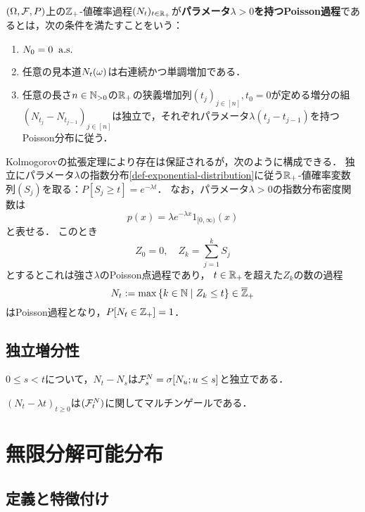 \documentclass[uplatex,dvipdfmx]{jsreport}
\begin{document}
\begin{definition}
    $(\Omega,\mathcal{F},P)$上の$\mathbb{Z}_+$-値確率過程$(N_t)_{t\in\mathbb{R}_+}$が\textbf{パラメータ$\lambda>0$を持つPoisson過程}であるとは，次の条件を満たすことをいう：
    \begin{enumerate}
        \item $N_0=0\;\;\mathrm{a.s.}$
        \item 任意の見本道$N_t(\omega)$は右連続かつ単調増加である．
        \item 任意の長さ$n\in\mathbb{N}_{>0}$の$\mathbb{R}_+$の狭義増加列$(t_j)_{j\in[n]},t_0=0$が定める増分の組$(N_{t_j}-N_{t_{j-1}})_{j\in[n]}$は独立で，それぞれパラメータ$\lambda(t_j-t_{j-1})$を持つPoisson分布に従う．
    \end{enumerate}
\end{definition}

\begin{discussion}[Poisson過程の構成]
    Kolmogorovの拡張定理により存在は保証されるが，次のように構成できる．
    独立にパラメータ$\lambda$の指数分布\ref{def-exponential-distribution}に従う$\mathbb{R}_+$-値確率変数列$(S_j)$を取る：$P[S_j\ge t]=e^{-\lambda t}$．
    なお，パラメータ$\lambda>0$の指数分布密度関数は
    \[p(x)=\lambda e^{-\lambda x}1_{[0,\infty)}(x)\]
    と表せる．
    このとき
    \[Z_0=0,\quad Z_k=\sum^k_{j=1}S_j\]
    とするとこれは強さ$\lambda$のPoisson点過程であり，
    $t\in\mathbb{R}_+$を超えた$Z_k$の数の過程
    \[N_t:=\max\left\{k\in\mathbb{N}\mid Z_k\le t\right\}\in\overline{\mathbb{Z}}_+\]
    はPoisson過程となり，$P[N_t\in\mathbb{Z}_+]=1$．
\end{discussion}

\subsection{独立増分性}

\begin{proposition}
    $0\le s<t$について，$N_t-N_s$は$\mathcal{F}^N_s=\sigma[N_u;u\le s]$と独立である．
\end{proposition}

\begin{corollary}
    $(N_t-\lambda t)_{t\ge0}$は$(\mathcal{F}_t^N)$に関してマルチンゲールである．
\end{corollary}

\section{無限分解可能分布}

\subsection{定義と特徴付け}
\end{document}
